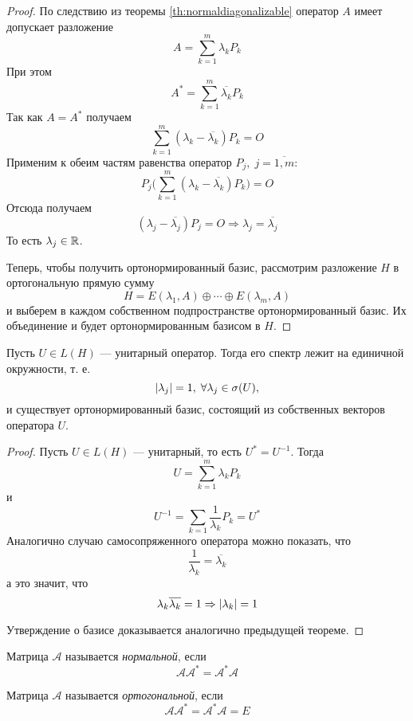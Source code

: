 \begin{proof}
    По следствию из теоремы \ref{th:normaldiagonalizable} оператор $A$
    имеет допускает разложение
    \[ A = \sum_{k=1}^m \lambda_k P_k \]
    При этом
    \[ A^* = \sum_{k=1}^m \overline{\lambda_k} P_k \]
    Так как $A = A^*$ получаем
    \[ \sum_{k=1}^m (\lambda_k - \overline{\lambda_k}) P_k = O \]
    Применим к обеим частям равенства оператор $P_j, \; j = \overline{1,m}$:
    \[ P_j \bigg( \sum_{k=1}^m (\lambda_k - \overline{\lambda_k}) P_k \bigg) = O
    \]
    Отсюда получаем
    \[ (\lambda_j - \overline{\lambda_j}) P_j = O \Rightarrow \lambda_j =
    \overline{\lambda_j} \]
    То есть $\lambda_j \in \mathbb{R}$.

    Теперь, чтобы получить ортонормированный базис, рассмотрим разложение $H$ в
    ортогональную прямую сумму
    \[ H = E(\lambda_1, A) \oplus \dotsb \oplus E(\lambda_m, A) \]
    и выберем в каждом собственном подпространстве ортонормированный базис. Их
    объединение и будет ортонормированным базисом в $H$.
\end{proof}

\begin{theorem}
    Пусть $U \in L(H)$ --- унитарный оператор. Тогда его спектр лежит на
    единичной окружности, т. е. \[\left|\lambda_j\right| = 1, \; \forall \lambda_j \in
    \operatorname{\sigma}(U),\] и существует ортонормированный базис, состоящий из
    собственных векторов оператора $U$.
\end{theorem}

\begin{proof}
    Пусть $U \in L(H)$ --- унитарный, то есть $U^* = U^{-1}$. Тогда
    \[ U = \sum_{k=1}^m \lambda_k P_k \]
    и
    \[ U^{-1} = \sum_{k=1} \frac{1}{\lambda_k} P_k = U^* \]
    Аналогично случаю самосопряженного оператора можно показать, что
    \[ \frac{1}{\lambda_k} = \overline{\lambda_k} \]
    а это значит, что
    \[ \lambda_k \overline{\lambda_k} = 1 \Rightarrow \left|\lambda_k\right| = 1 \]

    Утверждение о базисе доказывается аналогично предыдущей теореме.
\end{proof}

\begin{definition}
    Матрица $\mathcal{A}$ называется \emph{нормальной}, если 
    \[\mathcal{A} \mathcal{A}^* = \mathcal{A}^*\! \mathcal{A} \]
\end{definition}

\begin{definition}
    Матрица $\mathcal{A}$ называется \emph{ортогональной}, если 
    \[\mathcal{A} \mathcal{A}^* = \mathcal{A}^*\! \mathcal{A} = E \]
\end{definition}
